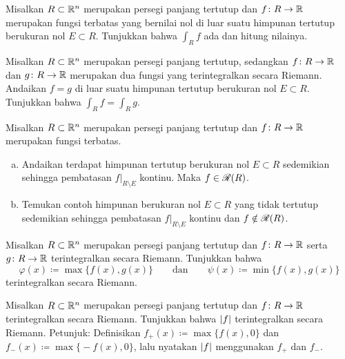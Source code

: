 \begin{exercise}
Misalkan $R \subset {\mathbb{R}}^n$ merupakan persegi panjang tertutup dan
$f \colon R \to {\mathbb{R}}$ merupakan fungsi terbatas yang bernilai nol di luar suatu
himpunan tertutup berukuran nol $E \subset R$. Tunjukkan bahwa $\int_R f$ ada
dan hitung nilainya.
\end{exercise}

\begin{exercise}
Misalkan $R \subset {\mathbb{R}}^n$ merupakan persegi panjang tertutup, sedangkan
$f \colon R \to {\mathbb{R}}$ dan $g \colon R \to {\mathbb{R}}$ merupakan dua fungsi yang
terintegralkan secara Riemann. Andaikan $f = g$ di luar suatu himpunan tertutup
berukuran nol $E \subset R$. Tunjukkan bahwa $\int_R f = \int_R g$.
\end{exercise}

\begin{samepage}
\begin{exercise}
Misalkan $R \subset {\mathbb{R}}^n$ merupakan persegi panjang tertutup dan
$f \colon R \to {\mathbb{R}}$ merupakan fungsi terbatas.
\begin{enumerate}[a)]
\item
Andaikan terdapat himpunan tertutup berukuran nol $E \subset R$ sedemikian
sehingga pembatasan $f|_{R\setminus E}$ kontinu. Maka $f \in {\mathscr{R}}(R)$.
\item
Temukan contoh himpunan berukuran nol $E \subset R$ yang tidak tertutup
sedemikian sehingga pembatasan $f|_{R\setminus E}$ kontinu dan
$f \notin {\mathscr{R}}(R)$.
\end{enumerate}
\end{exercise}
\end{samepage}

\begin{exercise}
Misalkan $R \subset {\mathbb{R}}^n$ merupakan persegi panjang tertutup dan
$f \colon R \to {\mathbb{R}}$ serta $g \colon R \to {\mathbb{R}}$ terintegralkan secara Riemann.
Tunjukkan bahwa
\begin{equation*}
\varphi(x) \coloneqq \max \bigl\{ f(x) , g(x) \bigr\}
\qquad
\text{dan}
\qquad
\psi(x) \coloneqq \min \bigl\{ f(x) , g(x) \bigr\}
\end{equation*}
terintegralkan secara Riemann.
\end{exercise}

\begin{exercise}
Misalkan $R \subset {\mathbb{R}}^n$ merupakan persegi panjang tertutup dan
$f \colon R \to {\mathbb{R}}$ terintegralkan secara Riemann. Tunjukkan bahwa $\lvert {f} \rvert$
terintegralkan secara Riemann. Petunjuk: Definisikan
$f_+(x) \coloneqq \max \bigl\{ f(x) , 0 \bigr\}$ dan
$f_-(x) \coloneqq \max \bigl\{ -f(x) , 0 \bigr\}$, lalu nyatakan $\lvert {f} \rvert$
menggunakan $f_+$ dan $f_-$.
\end{exercise}

